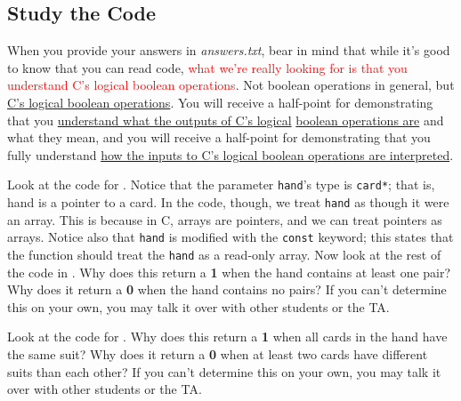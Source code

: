 \subsection{Study the Code} \label{subsec:studythecode}

When you provide your answers in \textit{answers.txt}, bear in mind that while it's good to know that you can read code, \textcolor{red}{what we're really looking for is that you understand C's logical boolean operations}.
Not boolean operations in general, but \underline{C's logical boolean operations}.
You will receive a half-point for demonstrating that you \underline{understand what the outputs of C's logical} \underline{boolean operations are} and what they mean,
and you will receive a half-point for demonstrating that you fully understand \underline{how the inputs to C's logical boolean operations are interpreted}.

Look at the code for .
Notice that the parameter \lstinline{hand}'s type is \lstinline{card*};
that is, \lstinline{}{hand} is a pointer to a \lstinline{}{card}.
In the code, though, we treat \lstinline{hand} as though it were an array.
This is because in C, arrays are pointers, and we can treat pointers as arrays.
Notice also that \lstinline{hand} is modified with the \lstinline{const} keyword;
this states that the  function should treat the \lstinline{hand} as a read-only array.
Now look at the rest of the code in .
Why does this return a \textbf{1} when the hand contains at least one pair?
Why does it return a \textbf{0} when the hand contains no pairs?
If you can't determine this on your own, you may talk it over with other students or the TA\@.
\begin{description}
\end{description}

Look at the code for .
Why does this return a \textbf{1} when all cards in the hand have the same suit?
Why does it return a \textbf{0} when at least two cards have different suits than each other?
If you can't determine this on your own, you may talk it over with other students or the TA\@.
\begin{description}
\end{description}

